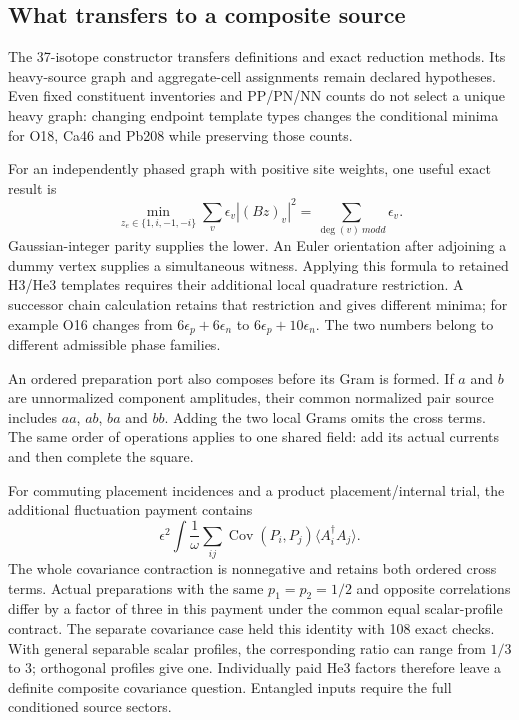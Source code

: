 \subsection{What transfers to a composite source}
\label{sec:composition-nov}

The 37-isotope constructor transfers definitions and exact reduction
methods. Its heavy-source graph and aggregate-cell assignments remain
declared hypotheses. Even fixed constituent inventories and PP/PN/NN
counts do not select a unique heavy graph: changing endpoint template types
changes the conditional minima for O18, Ca46 and Pb208 while preserving
those counts.

For an independently phased graph with positive site weights, one useful
exact result is
\begin{equation}
\min_{z_e\in\{1,i,-1,-i\}}\sum_v\epsilon_v|(Bz)_v|^2
=\sum_{\deg(v)\ {
m odd}}\epsilon_v.
\end{equation}
Gaussian-integer parity supplies the lower. An Euler orientation after
adjoining a dummy vertex supplies a simultaneous witness. Applying this
formula to retained H3/He3 templates requires their additional local
quadrature restriction. A successor chain calculation retains that
restriction and gives different minima; for example O16 changes from
$6\epsilon_p+6\epsilon_n$ to $6\epsilon_p+10\epsilon_n$.
The two numbers belong to different admissible phase families.

An ordered preparation port also composes before its Gram is formed. If
$a$ and $b$ are unnormalized component amplitudes, their common normalized
pair source includes $aa$, $ab$, $ba$ and $bb$. Adding the two local Grams
omits the cross terms. The same order of operations applies to one shared
field: add its actual currents and then complete the square.

For commuting placement incidences and a product placement/internal trial,
the additional fluctuation payment contains
\begin{equation}
\epsilon^2\int\frac{1}{\omega}
\sum_{ij}\operatorname{Cov}(P_i,P_j)
\langle A_i^\dagger A_j\rangle.
\label{eq:shared-cov-new}
\end{equation}
The whole covariance contraction is nonnegative and retains both ordered
cross terms. Actual preparations with the same $p_1=p_2=1/2$ and opposite
correlations differ by a factor of three in this payment under the common
equal scalar-profile contract. The separate covariance case held this
identity with 108 exact checks. With general separable scalar profiles,
the corresponding ratio can range from $1/3$ to $3$; orthogonal profiles
give one. Individually paid
He3 factors therefore leave a definite composite covariance question.
Entangled inputs require the full conditioned source sectors.

